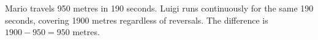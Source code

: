 Mario travels 950 metres in 190 seconds. Luigi runs continuously for the same 190 seconds, covering 1900 metres regardless of reversals. The difference is $1900-950=\boxed{950}$ metres.
